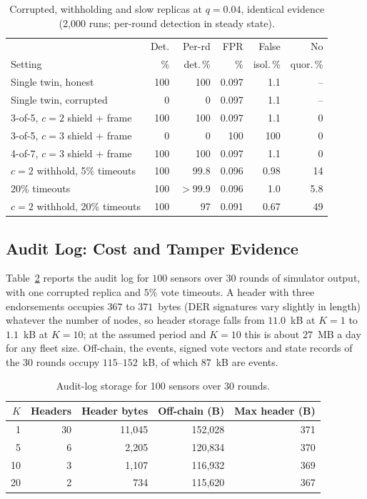 \documentclass[lineno,pdflatex,sn-nature]{sn-jnl}
\theoremstyle{thmstyleone}%
\theoremstyle{thmstylethree}%
\begin{document}
\begin{table}[!t]
\caption{Corrupted, withholding and slow replicas at $q=0.04$, identical evidence (2{,}000 runs; per-round detection in steady state).}
\label{tab:collusion}
\centering
\renewcommand{\arraystretch}{1.08}
\footnotesize
\setlength{\tabcolsep}{2.0pt}
\begin{tabular}{p{}rrrrr}
\toprule
 & {Det.} & {Per-rd} & {FPR} & {False} & {No} \\
{Setting} & {\%} & {det.\,\%} & {\%} & {isol.\,\%} & {quor.\,\%} \\
\midrule
Single twin, honest & 100 & 100 & 0.097 & 1.1 & -- \\
Single twin, corrupted & 0 & 0 & 0.097 & 1.1 & -- \\
3-of-5, $c=2$ shield + frame & 100 & 100 & 0.097 & 1.1 & 0 \\
3-of-5, $c=3$ shield + frame & 0 & 0 & 100 & 100 & 0 \\
4-of-7, $c=3$ shield + frame & 100 & 100 & 0.097 & 1.1 & 0 \\
\midrule
$c=2$ withhold, 5\% timeouts & 100 & 99.8 & 0.096 & 0.98 & 14 \\
20\% timeouts & 100 & $>$99.9 & 0.096 & 1.0 & 5.8 \\
$c=2$ withhold, 20\% timeouts & 100 & 97 & 0.091 & 0.67 & 49 \\
\bottomrule
\end{tabular}
\end{table}

\subsection{Audit Log: Cost and Tamper Evidence}
\label{sec:res-ext3}
Table~\ref{tab:chain} reports the audit log for $100$ sensors over
$30$ rounds of simulator output, with one corrupted replica and $5\%$
vote timeouts.  A header with three endorsements occupies $367$ to
$371$~bytes (DER signatures vary slightly in length) whatever the
number of nodes, so header storage falls from $11.0$~kB at $K=1$ to
$1.1$~kB at $K=10$; at the assumed period and $K=10$ this is about
$27$~MB a day for any fleet size.  Off-chain, the events, signed vote
vectors and state records of the 30 rounds occupy $115$--$152$~kB, of
which $87$~kB are events.

\begin{table}[!t]
\caption{Audit-log storage for 100 sensors over 30 rounds.}
\label{tab:chain}
\centering
\renewcommand{\arraystretch}{1.08}
\footnotesize
\setlength{\tabcolsep}{4pt}
\begin{tabular}{rrrrr}
\toprule
$K$ & {Headers} & {Header bytes} & {Off-chain (B)} & {Max header (B)} \\
\midrule
1 & 30 & 11{,}045 & 152{,}028 & 371 \\
5 & 6 & 2{,}205 & 120{,}834 & 370 \\
10 & 3 & 1{,}107 & 116{,}932 & 369 \\
20 & 2 & 734 & 115{,}620 & 367 \\
\bottomrule
\end{tabular}
\end{table}
\end{document}
